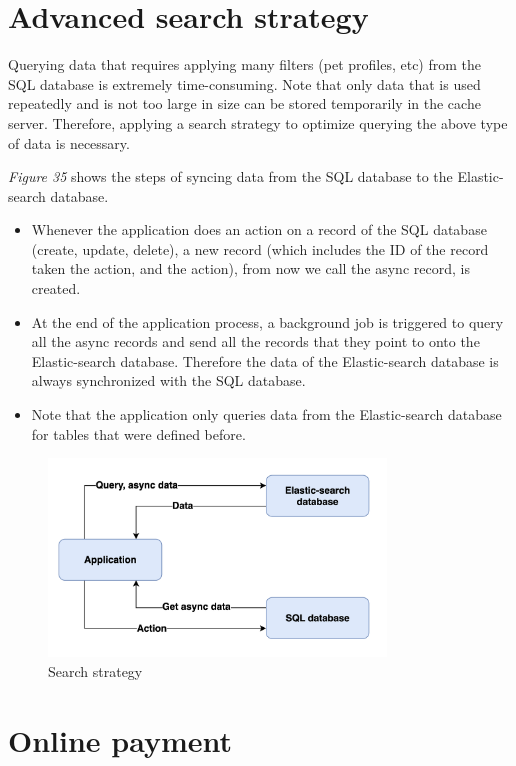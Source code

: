 \section{Advanced search strategy}

Querying data that requires applying many filters (pet profiles, etc)
from the SQL database is extremely time-consuming. Note that only data
that is used repeatedly and is not too large in size can be stored
temporarily in the cache server. Therefore, applying a search strategy
to optimize querying the above type of data is necessary.

\emph{Figure 35} shows the steps of syncing data from the SQL database
to the Elastic-search database.

\begin{itemize}
    \item
          Whenever the application does an action on a record of the SQL
          database (create, update, delete), a new record (which includes the ID
          of the record taken the action, and the action), from now we call the
          async record, is created.
    \item
          At the end of the application process, a background job is triggered
          to query all the async records and send all the records that they
          point to onto the Elastic-search database. Therefore the data of the
          Elastic-search database is always synchronized with the SQL database.
    \item
          Note that the application only queries data from the Elastic-search
          database for tables that were defined before.
\end{itemize}

\begin{figure}[H]
    \centering
    \includegraphics[width=0.8\textwidth]{Figures/search_strat.png}
    \caption{Search strategy}
\end{figure}

\section{Online payment}